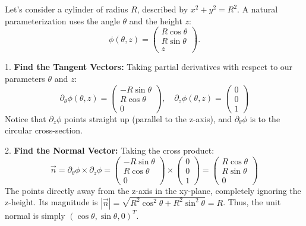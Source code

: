 \begin{example}
Let's consider a cylinder of radius $R$, described by $x^2 + y^2 = R^2$. 
A natural parameterization uses the angle $\theta$ and the height $z$:
\[
\phi(\theta, z) = \begin{pmatrix} R\cos\theta \\ R\sin\theta \\ z \end{pmatrix}.
\]

1. \textbf{Find the Tangent Vectors:}
Taking partial derivatives with respect to our parameters $\theta$ and $z$:
\[
\partial_\theta\phi(\theta,z) = \begin{pmatrix} -R\sin\theta \\ R\cos\theta \\ 0 \end{pmatrix}, \quad \partial_z\phi(\theta,z) = \begin{pmatrix} 0 \\ 0 \\ 1 \end{pmatrix}
\]
Notice that $\partial_z\phi$ points straight up (parallel to the z-axis), and $\partial_\theta\phi$ is  to the circular cross-section.

2. \textbf{Find the Normal Vector:}
Taking the cross product:
\[
\vec{n} = \partial_\theta\phi \times \partial_z\phi = 
\begin{pmatrix} -R\sin\theta \\ R\cos\theta \\ 0 \end{pmatrix} \times \begin{pmatrix} 0 \\ 0 \\ 1 \end{pmatrix} = 
\begin{pmatrix} R\cos\theta \\ R\sin\theta \\ 0 \end{pmatrix}
\]
The  points directly away from the z-axis in the xy-plane, completely ignoring the z-height. Its magnitude is $|\vec{n}| = \sqrt{R^2\cos^2\theta + R^2\sin^2\theta} = R$. Thus, the unit normal is simply $(\cos\theta, \sin\theta, 0)^T$.
\end{example}


